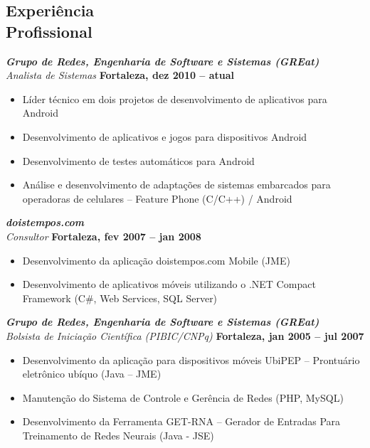 \documentclass[margin, 10pt]{res} %
\begin{document}
\begin{resume}
 

 
\section{Experiência \\ Profissional}

{\sl\bf Grupo de Redes, Engenharia de Software e Sistemas (GREat)}  \\
{\sl Analista de Sistemas} \hfill {\bf Fortaleza, dez 2010 -- atual}
\begin{itemize} \itemsep -2pt %
\item Líder técnico em dois projetos de desenvolvimento de aplicativos para Android
\item Desenvolvimento de aplicativos e jogos para dispositivos Android
\item Desenvolvimento de testes automáticos para Android
\item Análise e desenvolvimento de adaptações de sistemas embarcados para operadoras de celulares – Feature Phone (C/C++) / Android
\end{itemize}
 
{\sl\bf doistempos.com} \\
{\sl Consultor} \hfill {\bf Fortaleza, fev 2007 -- jan 2008}
\begin{itemize} \itemsep -2pt 
\item Desenvolvimento da aplicação doistempos.com Mobile (JME)
\item Desenvolvimento de aplicativos móveis utilizando o .NET Compact Framework (C\#, Web Services, SQL Server)
\end{itemize} 


{\sl\bf Grupo de Redes, Engenharia de Software e Sistemas (GREat)}  \\
{\sl Bolsista de Iniciação Científica (PIBIC/CNPq)} \hfill {\bf Fortaleza, jan 2005 -- jul 2007}
\begin{itemize} \itemsep -2pt %
\item Desenvolvimento da aplicação para dispositivos móveis UbiPEP – Prontuário eletrônico ubíquo (Java – JME)
\item Manutenção do Sistema de Controle e Gerência de Redes (PHP, MySQL)
\item Desenvolvimento da Ferramenta GET-RNA – Gerador de Entradas Para Treinamento de Redes Neurais (Java - JSE)
\end{itemize}


\end{resume}
\end{document}
